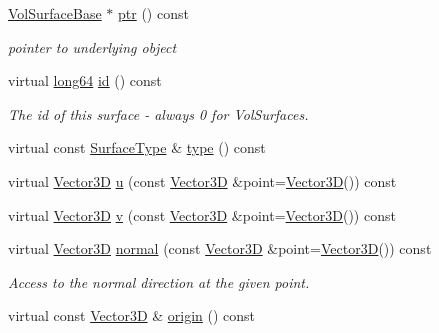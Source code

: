 \begin{DoxyCompactItemize}
\hyperlink{class_d_d4hep_1_1_d_d_rec_1_1_vol_surface_base}{VolSurfaceBase} $\ast$ \hyperlink{class_d_d4hep_1_1_d_d_rec_1_1_vol_surface_aed761d8bc4cf4b4d8f2b5e2bef8c0f7c}{ptr} () const 
\begin{DoxyCompactList}\small\item\em pointer to underlying object \item\end{DoxyCompactList}\item 
virtual \hyperlink{namespace_d_d4hep_ac2a70e722b33dc7ddaa20db8954ac836}{long64} \hyperlink{class_d_d4hep_1_1_d_d_rec_1_1_vol_surface_a2f65703996e3212715d994f03afa2242}{id} () const 
\begin{DoxyCompactList}\small\item\em The id of this surface -\/ always 0 for VolSurfaces. \item\end{DoxyCompactList}\item 
virtual const \hyperlink{class_d_d_surfaces_1_1_surface_type}{SurfaceType} \& \hyperlink{class_d_d4hep_1_1_d_d_rec_1_1_vol_surface_a3911ecafb91850168cadebc3ab2d5092}{type} () const 
\item 
virtual \hyperlink{class_d_d_surfaces_1_1_vector3_d}{Vector3D} \hyperlink{class_d_d4hep_1_1_d_d_rec_1_1_vol_surface_a6a23fdeba39bcffea350b53dcac8b3d0}{u} (const \hyperlink{class_d_d_surfaces_1_1_vector3_d}{Vector3D} \&point=\hyperlink{class_d_d_surfaces_1_1_vector3_d}{Vector3D}()) const 
\item 
virtual \hyperlink{class_d_d_surfaces_1_1_vector3_d}{Vector3D} \hyperlink{class_d_d4hep_1_1_d_d_rec_1_1_vol_surface_a46cb5a2e9e28ec469657b7331a83b0ed}{v} (const \hyperlink{class_d_d_surfaces_1_1_vector3_d}{Vector3D} \&point=\hyperlink{class_d_d_surfaces_1_1_vector3_d}{Vector3D}()) const 
\item 
virtual \hyperlink{class_d_d_surfaces_1_1_vector3_d}{Vector3D} \hyperlink{class_d_d4hep_1_1_d_d_rec_1_1_vol_surface_a2c5a55647d8f69637f4fc8d88bc70b67}{normal} (const \hyperlink{class_d_d_surfaces_1_1_vector3_d}{Vector3D} \&point=\hyperlink{class_d_d_surfaces_1_1_vector3_d}{Vector3D}()) const 
\begin{DoxyCompactList}\small\item\em Access to the normal direction at the given point. \item\end{DoxyCompactList}\item 
virtual const \hyperlink{class_d_d_surfaces_1_1_vector3_d}{Vector3D} \& \hyperlink{class_d_d4hep_1_1_d_d_rec_1_1_vol_surface_a4be2b8d1ebddf2ac394a55efc28a2e6e}{origin} () const 

\end{DoxyCompactItemize}
